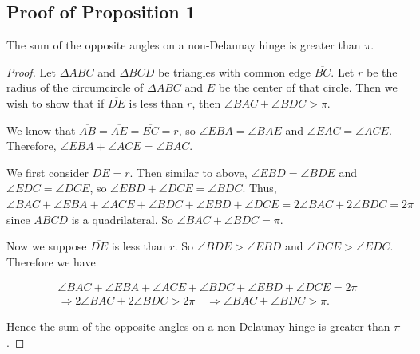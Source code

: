 \documentclass[12pt]{article}
\begin{document}
\subsection{Proof of Proposition 1}
The sum of the opposite angles on a non-Delaunay hinge is greater than $\pi$.
\begin{proof}
\label{prop1}
Let $\Delta ABC$ and $\Delta BCD$ be triangles with common edge $\overline{BC}$. Let $r$ be the radius of the circumcircle of  $\Delta ABC$ and $E$ be the center of that circle. Then we wish to show that if $\overline{DE}$ is less than $r$, then $\angle BAC + \angle BDC > \pi$.\newline

\noindent We know that $\overline{AB}=\overline{AE}=\overline{EC}=r$, so $\angle EBA = \angle BAE$ and $\angle EAC = \angle ACE$. Therefore, $\angle EBA + \angle ACE= \angle BAC$.\newline

\noindent We first consider $\overline{DE}=r$. Then similar to above, $\angle EBD = \angle BDE$ and $\angle EDC = \angle DCE$, so $\angle EBD + \angle DCE= \angle BDC$. Thus, $\angle BAC + \angle EBA + \angle ACE + \angle BDC + \angle EBD + \angle DCE = 2\angle BAC + 2\angle BDC = 2\pi$
since $ABCD$ is a quadrilateral. So $\angle BAC + \angle BDC = \pi$.\newline

\noindent Now we suppose $\overline{DE}$ is less than $r$. So $\angle BDE > \angle EBD$ and $\angle DCE > \angle EDC$. Therefore we have

\begin{align*}
\angle BAC + \angle EBA + \angle ACE + \angle BDC + \angle EBD + \angle DCE = 2\pi \\
\Rightarrow 2\angle BAC + 2\angle BDC > 2\pi \quad \Rightarrow \angle BAC + \angle BDC > \pi.
\end{align*}

\noindent Hence the sum of the opposite angles on a non-Delaunay hinge is greater than $\pi$. \qedhere
\end{proof}
\end{document}
